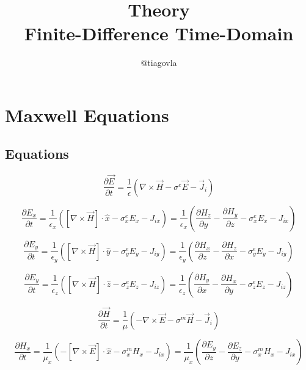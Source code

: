 \documentclass[10pt]{article}
\title{\textbf{Theory\\ Finite-Difference Time-Domain}}
\author{@tiagovla}
\date{}
\begin{document}
\maketitle
\section{Maxwell Equations}%
\subsection{Equations}%

\begin{equation}
	\frac{\partial \vec{E}}{\partial t} =
	\frac{1}{\epsilon} \left( \nabla \times \vec{H} - \sigma^{e} \vec{E} - \vec{J}_{i} \right)
\end{equation}

\begin{equation}
	\frac{\partial E_{x}}{\partial t} =
	\frac{1}{\epsilon_{x}} \left( \left[ \nabla \times \vec{H} \right] \cdot \hat{x} - \sigma^{e}_{x} E_{x} - J_{ix} \right) =
	\frac{1}{\epsilon_{x}} \left( \frac{\partial H_{z}}{\partial y} - \frac{\partial H_{y}}{\partial z} - \sigma^{e}_{x} E_{x} - J_{ix} \right)
\end{equation}

\begin{equation}
	\frac{\partial E_{y}}{\partial t} =
	\frac{1}{\epsilon_{y}} \left( \left[ \nabla \times \vec{H} \right] \cdot \hat{y} - \sigma^{e}_{y} E_{y} - J_{iy} \right) =
	\frac{1}{\epsilon_{y}} \left( \frac{\partial H_{x}}{\partial z} - \frac{\partial H_{z}}{\partial x} - \sigma^{e}_{y} E_{y} - J_{iy} \right)
\end{equation}

\begin{equation}
	\frac{\partial E_{y}}{\partial t} =
	\frac{1}{\epsilon_{z}} \left( \left[ \nabla \times \vec{H} \right] \cdot \hat{z} - \sigma^{e}_{z} E_{z} - J_{iz} \right) =
	\frac{1}{\epsilon_{z}} \left( \frac{\partial H_{y}}{\partial x} - \frac{\partial H_{x}}{\partial y} - \sigma^{e}_{z} E_{z} - J_{iz} \right)
\end{equation}



\begin{equation}
	\frac{\partial \vec{H}}{\partial t} =
	\frac{1}{\mu} \left( - \nabla \times \vec{E} - \sigma^{m} \vec{H} - \vec{J}_{i} \right)
\end{equation}

\begin{equation}
	\frac{\partial H_{x}}{\partial t} =
	\frac{1}{\mu_{x}} \left( - \left[ \nabla \times \vec{E} \right] \cdot \hat{x} - \sigma^{m}_{x} H_{x} - J_{ix} \right) =
	\frac{1}{\mu_{x}} \left( \frac{\partial E_{y}}{\partial z} - \frac{\partial E_{z}}{\partial y} - \sigma^{m}_{x} H_{x} - J_{ix} \right)
\end{equation}
\end{document}
